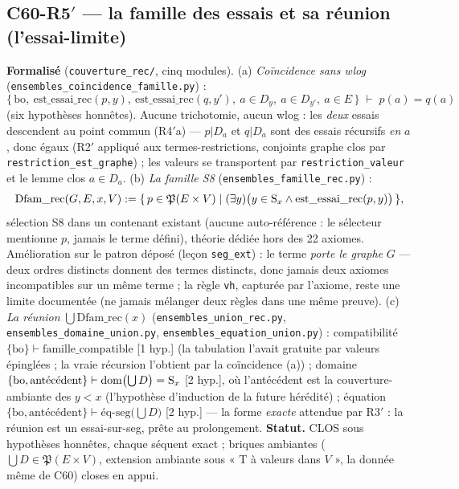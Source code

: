 \subsection{C60-R5$'$ --- la famille des essais et sa réunion (l'essai-limite)}
\textbf{Formalisé} (\texttt{couverture\_rec/}, cinq modules). (a)
\emph{Coïncidence sans wlog} (\texttt{ensembles\_coincidence\_famille.py}) :
\[
  \{\,\text{bo},\ \mathrm{est\_essai\_rec}(p, y),\ \mathrm{est\_essai\_rec}(q, y'),\
     a \in D_y,\ a \in D_{y'},\ a \in E\,\} \;\vdash\; p(a) = q(a)
\]
(six hypothèses honnêtes).
Aucune trichotomie, aucun wlog : les \emph{deux} essais descendent au point
commun (R4$'$a) --- $p|D_a$ et $q|D_a$ sont des essais récursifs \emph{en} $a$,
donc égaux (R2$'$ appliqué aux termes-restrictions, conjoints graphe clos par
\texttt{restriction\_est\_graphe}) ; les valeurs se transportent par
\texttt{restriction\_valeur} et le lemme clos $a \in D_a$. (b) \emph{La famille
S8} (\texttt{ensembles\_famille\_rec.py}) :
\[
  \mathrm{Dfam\_rec}(G, E, x, V) :=
  \{\, p \in \mathfrak{P}(E \times V) \mid
      (\exists y)\bigl(y \in \mathrm{S}_x \wedge \mathrm{est\_essai\_rec}(p, y)\bigr) \,\},
\]
sélection S8 dans un contenant existant (aucune auto-référence : le sélecteur
mentionne $p$, jamais le terme défini), théorie dédiée hors des 22 axiomes.
Amélioration sur le patron déposé (leçon \texttt{seg\_ext}) : le terme
\emph{porte le graphe} $G$ --- deux ordres distincts donnent des termes
distincts, donc jamais deux axiomes incompatibles sur un même terme ; la règle
\texttt{vh}, capturée par l'axiome, reste une limite documentée (ne jamais
mélanger deux règles dans une même preuve). (c) \emph{La réunion}
$\bigcup \mathrm{Dfam\_rec}(x)$ (\texttt{ensembles\_union\_rec.py},
\texttt{ensembles\_domaine\_union.py}, \texttt{ensembles\_equation\_union.py}) :
compatibilité $\{\text{bo}\} \vdash \mathrm{famille\_compatible}$ [1 hyp.] (la
tabulation l'avait gratuite par valeurs épinglées ; la vraie récursion l'obtient
par la coïncidence (a)) ; domaine $\{\text{bo}, \text{antécédent}\} \vdash
\mathrm{dom}\bigl(\bigcup D\bigr) = \mathrm{S}_x$ [2 hyp.], où l'antécédent est la
couverture-ambiante des $y < x$ (l'hypothèse d'induction de la future hérédité) ;
équation $\{\text{bo}, \text{antécédent}\} \vdash
\text{éq-seg}\bigl(\bigcup D\bigr)$ [2 hyp.] --- la forme \emph{exacte} attendue
par R3$'$ : la réunion est un essai-sur-seg, prête au prolongement.
\textbf{Statut.} CLOS sous hypothèses honnêtes, chaque séquent exact ; briques
ambiantes ($\bigcup D \in \mathfrak{P}(E \times V)$, extension ambiante sous
« $\mathrm{T}$ à valeurs dans $V$ », la donnée même de C60) closes en appui.

